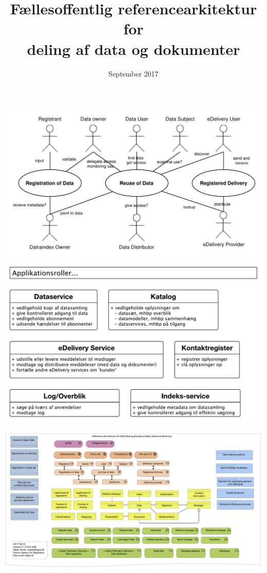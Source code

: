 \documentclass[12pt]{article}
\title{Fællesoffentlig referencearkitektur for \\ deling af data og dokumenter}
\author{}
\date{September 2017}
\begin{document}
\maketitle





\newpage
\thispagestyle{empty}
\includegraphics[width=\textwidth]{../usecases.pdf}
\includegraphics[width=\textwidth]{../tjenester.pdf}

\includegraphics[angle=90, height=\textheight]{../overview.pdf}
\end{document}
